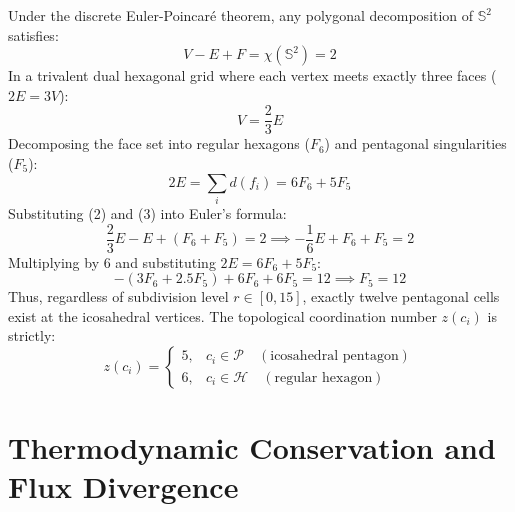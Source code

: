\documentclass[10pt,twocolumn,letterpaper]{article}
\begin{document}
Under the discrete Euler-Poincaré theorem, any polygonal decomposition of $\mathbb{S}^2$ satisfies:
\begin{equation}
  V - E + F = \chi(\mathbb{S}^2) = 2
\end{equation}
In a trivalent dual hexagonal grid where each vertex meets exactly three faces ($2E = 3V$):
\begin{equation}
  V = \frac{2}{3}E
\end{equation}
Decomposing the face set into regular hexagons ($F_6$) and pentagonal singularities ($F_5$):
\begin{equation}
  2E = \sum_{i} d(f_i) = 6F_6 + 5F_5
\end{equation}
Substituting (2) and (3) into Euler's formula:
\begin{equation}
  \frac{2}{3}E - E + (F_6 + F_5) = 2 \implies -\frac{1}{6}E + F_6 + F_5 = 2
\end{equation}
Multiplying by 6 and substituting $2E = 6F_6 + 5F_5$:
\begin{equation}
  -(3F_6 + 2.5F_5) + 6F_6 + 6F_5 = 12 \implies F_5 = 12
\end{equation}
Thus, regardless of subdivision level $r \in [0, 15]$, exactly twelve pentagonal cells exist at the icosahedral vertices. The topological coordination number $z(c_i)$ is strictly:
\begin{equation}
  z(c_i) = 
  \begin{cases}
    5, & c_i \in \mathcal{P} \quad (\text{icosahedral pentagon}) \\
    6, & c_i \in \mathcal{H} \quad (\text{regular hexagon})
  \end{cases}
\end{equation}

\section{Thermodynamic Conservation and Flux Divergence}
\end{document}
